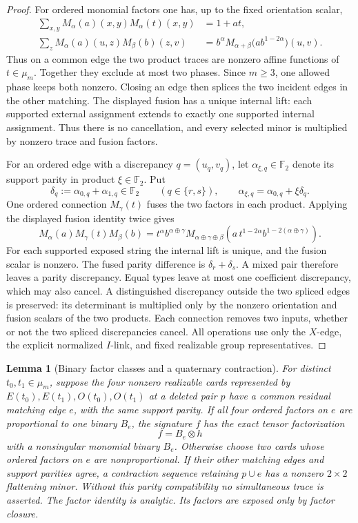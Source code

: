 \documentclass[11pt,letterpaper,onecolumn]{article}
\theoremstyle{plain}
\newtheorem{lemma}[lemma]{Lemma}
\theoremstyle{definition}
\theoremstyle{remark}
\newcommand{\Ftwo}{\mathbb F_2}
\begin{document}
\begin{proof}
For ordered monomial factors one has, up to the fixed orientation scalar,
\begin{align*}
 \sum_{x,y}M_\alpha(a)(x,y)M_\alpha(t)(x,y)&=1+at,\\
 \sum_zM_\alpha(a)(u,z)M_\beta(b)(z,v)
  &=b^\alpha M_{\alpha+\beta}
       \bigl(ab^{1-2\alpha}\bigr)(u,v).
\end{align*}
Thus on a common edge the two product traces are nonzero affine functions
of \(t\in\mu_m\). Together they exclude at most two phases.  Since
\(m\ge3\), one allowed phase keeps both nonzero.  Closing an edge then
splices the two incident edges in the other matching.  The displayed fusion has a unique internal lift: each supported
external assignment extends to exactly one supported internal assignment.
Thus there is no cancellation, and every selected minor is multiplied
by nonzero trace and fusion factors.

For an ordered edge with a discrepancy \(q=(u_q,v_q)\), let
\(\alpha_{\xi,q}\in\Ftwo\) denote its support parity in product
\(\xi\in\Ftwo\).  Put
\[
 \delta_q:=\alpha_{0,q}+\alpha_{1,q}\in\Ftwo
 \qquad(q\in\{r,s\}),\qquad
 \alpha_{\xi,q}=\alpha_{0,q}+\xi\delta_q.
\]
One ordered connection \(M_\gamma(t)\) fuses the two factors in each
product.  Applying the displayed fusion identity twice gives
\[
 M_\alpha(a)M_\gamma(t)M_\beta(b)
 =t^\alpha b^{\alpha\oplus\gamma}
 M_{\alpha\oplus\gamma\oplus\beta}
 \!\left(a\,t^{1-2\alpha}b^{1-2(\alpha\oplus\gamma)}\right).
\]
For each supported exposed string the internal lift is unique, and the
fusion scalar is nonzero.  The fused parity difference is
\(\delta_r+\delta_s\).  A mixed pair therefore leaves a parity
discrepancy. Equal types leave at most one coefficient discrepancy, which
may also cancel.  A distinguished discrepancy outside the two spliced
edges is preserved: its determinant is multiplied only by the nonzero
orientation and fusion scalars of the two products.  Each connection
removes two inputs, whether or not the two spliced discrepancies cancel.
All operations use only the \(X\)-edge, the explicit normalized
\(I\)-link,
and fixed realizable group representatives.
\end{proof}

\begin{lemma}[Binary factor classes and a quaternary contraction]
\label{lem:app-nd-coefficient-line-factor}
For distinct \(t_0,t_1\in\mu_m\), suppose the four nonzero realizable cards
represented by \(E(t_0),E(t_1),O(t_0),O(t_1)\) at a deleted pair \(p\)
have a common residual matching edge \(e\), with the same support parity.
If all four ordered factors on \(e\) are proportional to one binary \(B_e\), the signature \(f\) has the exact tensor factorization
\[
  f=B_e\otimes h
\]
with a nonsingular monomial binary \(B_e\).  Otherwise choose two cards
whose ordered factors on \(e\) are nonproportional.  If their other
matching edges and support parities agree, a contraction sequence retaining
\(p\cup e\) has a nonzero \(2\times2\) flattening minor.  Without this
parity compatibility no simultaneous trace is asserted.  The factor
identity is analytic. Its factors are exposed only by factor closure.
\end{lemma}
\end{document}
